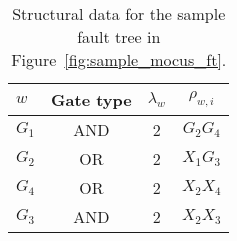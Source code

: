 \begin{table}[htbp]
  \centering
  \caption{Structural data for the sample fault tree in Figure~\ref{fig:sample_mocus_ft}.}
  \label{tab:sample_mocus_ft_data}
  \begin{tabular}{@{}lccc@{}}
    \toprule
    $w$ & Gate type & $\lambda_{w}$ & $\rho_{w,i}$ \\ \midrule
    $G_1$ & AND & 2 & $G_2$\;\;$G_4$ \\
    $G_2$ & OR  & 2 & $X_1$\;\;$G_3$ \\
    $G_4$ & OR  & 2 & $X_2$\;\;$X_4$ \\
    $G_3$ & AND & 2 & $X_2$\;\;$X_3$ \\ \bottomrule
  \end{tabular}
\end{table}